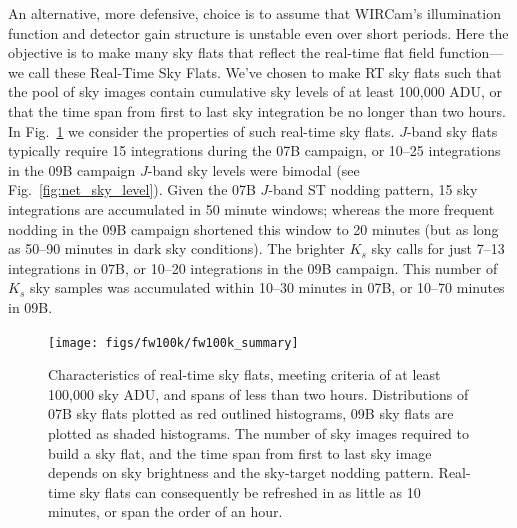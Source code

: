 \documentclass[iop]{emulateapj}
\newcommand{\Fig}[1]{Fig.~\ref{fig:#1}}  %
\begin{document}
An alternative, more defensive, choice is to assume that WIRCam's illumination function and detector gain structure is unstable even over short periods.
Here the objective is to make many sky flats that reflect the real-time flat field function---we call these Real-Time Sky Flats.
We've chosen to make RT sky flats such that the pool of sky images contain cumulative sky levels of at least 100,000 ADU, or that the time span from first to last sky integration be no longer than two hours.
In \Fig{fw100k_summary} we consider the properties of such real-time sky flats.
$J$-band sky flats typically require 15 integrations during the 07B campaign, or 10--25 integrations in the 09B campaign $J$-band sky levels were bimodal (see \Fig{net_sky_level}).
Given the 07B $J$-band ST nodding pattern, 15 sky integrations are accumulated in 50 minute windows; whereas the more frequent nodding in the 09B campaign shortened this window to 20 minutes (but as long as 50--90 minutes in dark sky conditions).
The brighter $K_s$ sky calls for just 7--13 integrations in 07B, or 10--20 integrations in the 09B campaign.
This number of $K_s$ sky samples was accumulated within 10--30 minutes in 07B, or 10--70 minutes in 09B.

\begin{figure}[t]
\centering
\texttt{[image: figs/fw100k/fw100k\_summary]}
\caption{
Characteristics of real-time sky flats, meeting criteria of at least 100,000 sky ADU, and spans of less than two hours.
Distributions of 07B sky flats plotted as red outlined histograms, 09B sky flats are plotted as shaded histograms.
The number of sky images required to build a sky flat, and the time span from first to last sky image depends on sky brightness and the sky-target nodding pattern.
Real-time sky flats can consequently be refreshed in as little as 10 minutes, or span the order of an hour.
}
\label{fig:fw100k_summary}
\end{figure}
\end{document}
